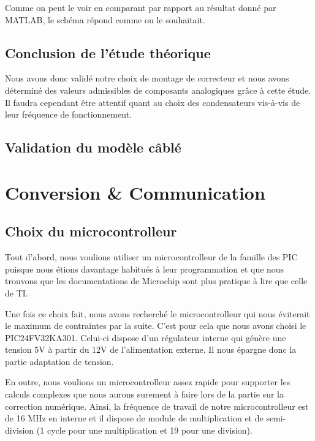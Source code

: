 \documentclass[11pt, french]{article} %
\begin{document}
Comme on peut le voir en comparant par rapport au résultat donné par MATLAB, le schéma répond comme on le souhaitait. 

\vspace{0.5cm}
\subsection{Conclusion de l'étude théorique}

\noindent
Nous avons donc validé notre choix de montage de correcteur et nous avons déterminé des valeurs admissibles de composants analogiques grâce à cette étude. Il faudra cependant être attentif quant au choix des condensateurs vis-à-vis de leur fréquence de fonctionnement.  

\subsection{Validation du modèle câblé}


\section{Conversion \& Communication}
\subsection{Choix du microcontrolleur}

Tout d'abord, nous voulions utiliser un microcontrolleur de la famille des PIC puisque nous étions davantage habitués à leur programmation et que nous trouvons que les documentations de Microchip sont plus pratique à lire que celle de TI.  %

Une fois ce choix fait, nous avons recherché le microcontrolleur qui nous éviterait le maximum de contraintes par la suite. C'est pour cela que nous avons choisi le PIC24FV32KA301. Celui-ci dispose d'un régulateur interne qui génère une tension 5V à partir du 12V de l'alimentation externe. Il nous épargne donc la partie adaptation de tension. 

En outre, nous voulions un microcontrolleur assez rapide pour supporter les calculs complexes que nous aurons surement à faire lors de la partie sur la correction numérique. Ainsi, la fréquence de travail de notre microcontrolleur est de 16 MHz en interne et il dispose de module de multiplication et de semi-division (1 cycle pour une multiplication et 19 pour une division). 
\end{document}
